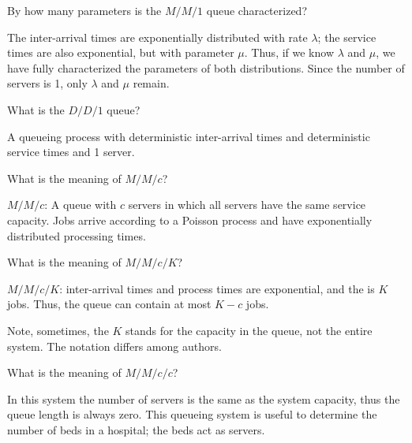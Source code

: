 \begin{exercise}
  By how many parameters is the $M/M/1$ queue characterized?
  \begin{solution}
    The inter-arrival times are exponentially distributed with rate $\lambda$; the service times are also exponential, but with parameter $\mu$. Thus, if we know $\lambda$ and $\mu$, we have fully characterized the parameters of both distributions. Since the number of servers is 1, only $\lambda$ and $\mu$ remain.
  \end{solution}
\end{exercise}

\begin{exercise}
What is the $D/D/1$ queue?  
\begin{solution}
  A queueing process with deterministic inter-arrival times and deterministic service times and 1 server.
\end{solution}
\end{exercise}

\begin{exercise}
  What is the meaning of $M/M/c$?
  \begin{solution}
$M/M/c$: A  queue with $c$ servers in which
  all servers have the same service capacity. Jobs arrive according to a
  Poisson process and have exponentially distributed processing times.
  \end{solution}
\end{exercise}

\begin{exercise}
  What is the meaning of $M/M/c/K$?
  \begin{solution}
\item $M/M/c/K$: inter-arrival times and process times are exponential,
  and the  is $K$ jobs. Thus, the queue can
  contain at most $K-c$ jobs. 

Note, sometimes, the $K$ stands for
    the capacity in the queue, not the entire system. The notation differs among
    authors.
  \end{solution}
\end{exercise}


\begin{exercise}
  What is the meaning of $M/M/c/c$?
  \begin{solution}
 In this system the number of servers is the same as
  the system capacity, thus the queue length is always zero. This
  queueing system is useful to determine the number of beds
  in a hospital; the beds act as servers.
  \end{solution}
\end{exercise}

